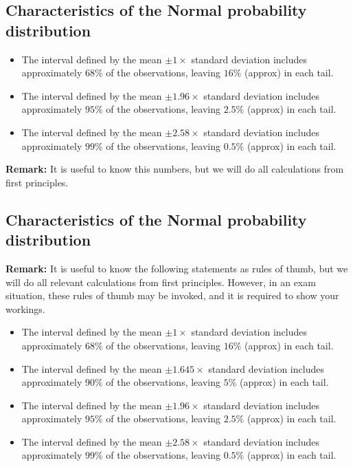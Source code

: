 \documentclass[]{report}
\begin{document}
{
	\subsection{ Characteristics of the Normal probability distribution}
	\begin{itemize}
		\item The interval defined by the mean $ \pm 1 \times $ standard deviation includes approximately $68\%$ of the observations, leaving $16\%$ (approx) in each tail.
		\item The interval defined by the mean $ \pm 1.96 \times $ standard deviation includes approximately $95\%$ of the observations, leaving $2.5\%$ (approx) in each tail.
		\item The interval defined by the mean $ \pm 2.58 \times $ standard deviation includes approximately $99\%$ of the observations, leaving $0.5\%$ (approx) in each tail.
	\end{itemize}
	\textbf{Remark:} It is useful to know this numbers, but we will do all calculations from first principles.
}
	

	\subsection{Characteristics of the Normal probability distribution}
	\textbf{Remark:} It is useful to know the following statements as rules of thumb, but we will do all relevant calculations from first principles. However, in an exam situation, these rules of thumb may be invoked, and it is required to show your workings.
	\begin{itemize}
		\item The interval defined by the mean $ \pm 1 \times $ standard deviation includes approximately $68\%$ of the observations, leaving $16\%$ (approx) in each tail.
		\item The interval defined by the mean $ \pm 1.645 \times $ standard deviation includes approximately $90\%$ of the observations, leaving $5\%$ (approx) in each tail.
		\item The interval defined by the mean $ \pm 1.96 \times $ standard deviation includes approximately $95\%$ of the observations, leaving $2.5\%$ (approx) in each tail.
		
		\item The interval defined by the mean $ \pm 2.58 \times $ standard deviation includes approximately $99\%$ of the observations, leaving $0.5\%$ (approx) in each tail.
	\end{itemize}
	
\end{document}
